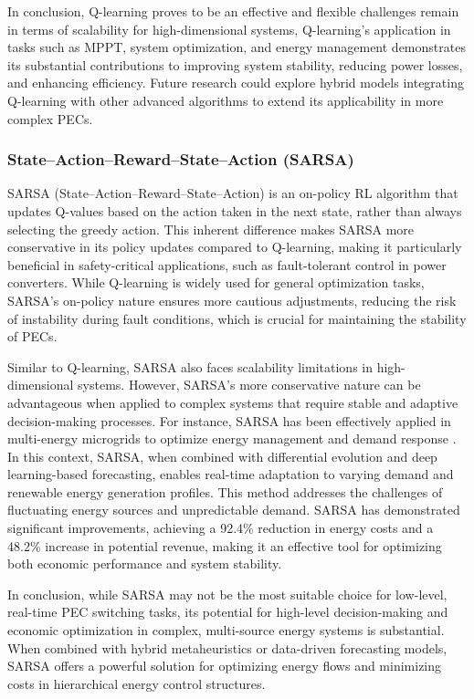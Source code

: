 In conclusion, Q-learning proves to be an effective and flexible challenges remain in terms of scalability for high-dimensional systems, Q-learning's application in tasks such as MPPT, system optimization, and energy management demonstrates its substantial contributions to improving system stability, reducing power losses, and enhancing efficiency. Future research could explore hybrid models integrating Q-learning with other advanced algorithms to extend its applicability in more complex PECs.

\subsubsection{State–Action–Reward–State–Action (SARSA)}

SARSA (State–Action–Reward–State–Action) is an on-policy RL algorithm that updates Q-values based on the action taken in the next state, rather than always selecting the greedy action. This inherent difference makes SARSA more conservative in its policy updates compared to Q-learning, making it particularly beneficial in safety-critical applications, such as fault-tolerant control in power converters. While Q-learning is widely used for general optimization tasks, SARSA's on-policy nature ensures more cautious adjustments, reducing the risk of instability during fault conditions, which is crucial for maintaining the stability of PECs.

Similar to Q-learning, SARSA also faces scalability limitations in high-dimensional systems. However, SARSA's more conservative nature can be advantageous when applied to complex systems that require stable and adaptive decision-making processes. For instance, SARSA has been effectively applied in multi-energy microgrids to optimize energy management and demand response \cite{mughees2025optimizing}. In this context, SARSA, when combined with differential evolution and deep learning-based forecasting, enables real-time adaptation to varying demand and renewable energy generation profiles. This method addresses the challenges of fluctuating energy sources and unpredictable demand. SARSA has demonstrated significant improvements, achieving a 92.4\% reduction in energy costs and a 48.2\% increase in potential revenue, making it an effective tool for optimizing both economic performance and system stability.

In conclusion, while SARSA may not be the most suitable choice for low-level, real-time PEC switching tasks, its potential for high-level decision-making and economic optimization in complex, multi-source energy systems is substantial. When combined with hybrid metaheuristics or data-driven forecasting models, SARSA offers a powerful solution for optimizing energy flows and minimizing costs in hierarchical energy control structures.

